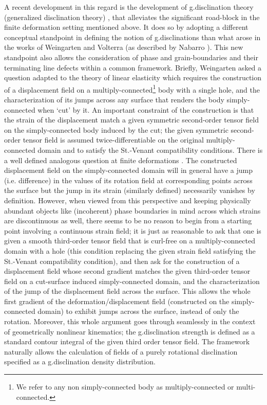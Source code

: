 \documentclass[11pt,letterpaper]{article}
\begin{document}
A recent development in this regard is the development of g.disclination theory (generalized disclination theory) \cite{acharya2012coupled, acharya2015continuum}, that alleviates the significant road-block in the finite deformation setting mentioned above. It does so by adopting a different conceptual standpoint in defining the notion of g.disclinations than what arose in the works of Weingarten and Volterra (as described by Nabarro \cite{Nabarro1987}). This new standpoint also allows the consideration of phase and grain-boundaries and their terminating line defects within a common framework. Briefly, Weingarten asked a question adapted to the theory of linear elasticity which requires the construction of a displacement field on a multiply-connected\footnote{We refer to any non simply-connected body as multiply-connected or multi-connected.} body with a single hole, and the characterization of its jumps across any surface that renders the body simply-connected when `cut' by it. An important constraint of the construction is that the strain of the displacement match a given symmetric second-order tensor field on the simply-connected body induced by the cut; the given symmetric second-order tensor field is assumed twice-differentiable on the original multiply-connected domain and to satisfy the St.-Venant compatibility conditions. There is a well defined analogous question at finite deformations  \cite{casey2004volterra}. The constructed displacement field on the simply-connected domain will in general have a jump (i.e. difference) in the values of its rotation field at corresponding points across the surface but the jump in its strain (similarly defined) necessarily vanishes by definition. However, when viewed from this perspective and keeping physically abundant objects like (incoherent) phase boundaries in mind across which strains are discontinuous as well, there seems to be no reason to begin from a starting point involving a continuous strain field; it is just as reasonable to ask that one is given a smooth third-order tensor field that is curl-free on a multiply-connected domain with a hole (this condition replacing the given strain field satisfying the St.-Venant compatibility condition), and then ask for the construction of a displacement field whose second gradient matches the given third-order tensor field on a cut-surface induced simply-connected domain, and the characterization of the jump of the displacement field across the surface. This allows the whole first gradient of the deformation/displacement field (constructed on the simply-connected domain) to exhibit jumps across the surface, instead of only the rotation. Moreover, this whole argument goes through seamlessly in the context of geometrically nonlinear kinematics; the g.disclination strength is defined as a standard contour integral of the given third order tensor field. The framework naturally allows the calculation of fields of a purely rotational disclination specified as a g.disclination density distribution.
\end{document}
